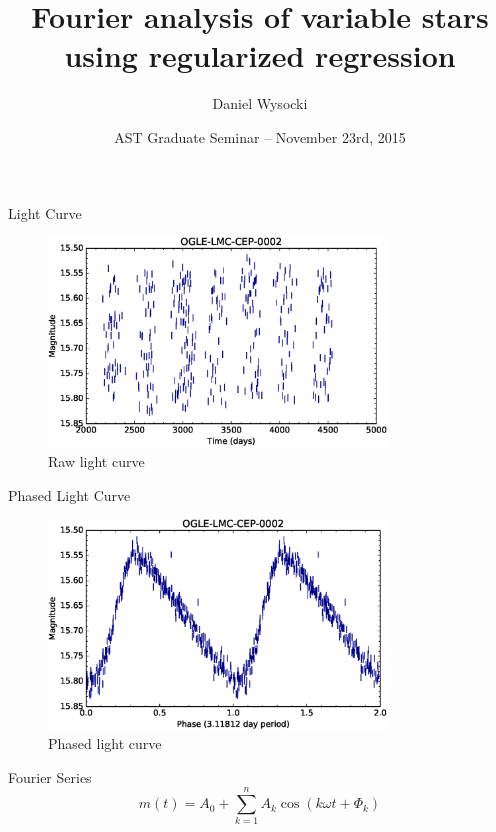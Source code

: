 \documentclass{beamer}
\title[Variable Stars]{
  Fourier analysis of variable stars using regularized regression
}
\author[Daniel Wysocki]{
  Daniel Wysocki
}
\institute[RIT]{
  Rochester Institute of Technology
}
\date[Nov 23, 2015]{AST Graduate Seminar -- November 23rd, 2015}
\begin{document}
\maketitle


\begin{frame}{Light Curve}
  \begin{figure}[ht]
    \centering
    \includegraphics[width=0.8\textwidth]{img/lightcurve-raw}
    \caption{Raw light curve}
  \end{figure}
\end{frame}


\begin{frame}{Phased Light Curve}
  \begin{figure}[ht]
    \centering
    \includegraphics[width=0.8\textwidth]{img/lightcurve-phased}
    \caption{Phased light curve}
  \end{figure}
\end{frame}


\begin{frame}{Fourier Series}
  \begin{displaymath}
    m(t) = A_0 + \sum_{k=1}^n A_k \cos(k \omega t + \Phi_k)
  \end{displaymath}
\end{frame}
\end{document}
